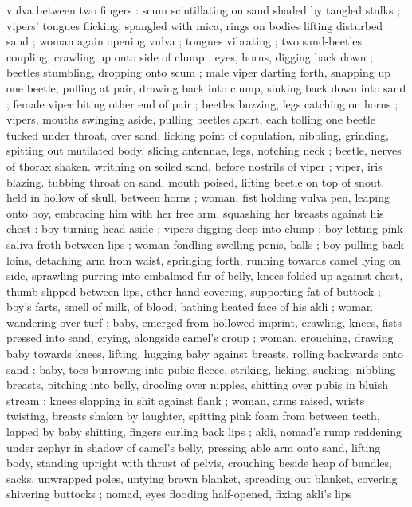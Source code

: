 vulva between two fingers : scum scintillating on sand shaded by 
tangled stalks ; vipers' tongues flicking, spangled with mica, rings on 
bodies lifting disturbed sand ; woman again opening vulva ; tongues 
vibrating ; two sand-beetles coupling, crawling up onto side of clump 
: eyes, horns, digging back down ; beetles stumbling, dropping onto 
scum ; male viper darting forth, snapping up one beetle, pulling at 
pair, drawing back into clump, sinking back down into sand ; female 
viper biting other end of pair ; beetles buzzing, legs catching on 
horns ; vipers, mouths swinging aside, pulling beetles apart, each 
tolling one beetle tucked under throat, over sand, licking point of 
copulation, nibbling, grinding, spitting out mutilated body, slicing 
antennae, legs, notching neck ; beetle, nerves of thorax shaken. 
writhing on soiled sand, before nostrils of viper ; viper, iris blazing. 
tubbing throat on sand, mouth poised, lifting beetle on top of snout. 
held in hollow of skull, between horns ; woman, fist holding vulva 
pen, leaping onto boy, embracing him with her free arm, squashing 
her breasts against his chest : boy turning head aside ; vipers 
digging deep into clump ; boy letting pink saliva froth between lips ; 
woman fondling swelling penis, balls ; boy pulling back loins, 
detaching arm from waist, springing forth, running towards camel 
lying on side, sprawling purring into embalmed fur of belly, knees 
folded up against chest, thumb slipped between lips, other hand 
covering, supporting fat of buttock ; boy's farts, smell of milk, of 
blood, bathing heated face of his akli ; woman wandering over turf ; 
baby, emerged from hollowed imprint, crawling, knees, fists pressed 
into sand, crying, alongside camel's croup ; woman, crouching, 
drawing baby towards knees, lifting, hugging baby against breasts, 
rolling backwards onto sand : baby, toes burrowing into pubic fleece, 
striking, licking, sucking, nibbling breasts, pitching into belly, 
drooling over nipples, shitting over pubis in bluish stream ; knees 
slapping in shit against flank ; woman, arms raised, wrists twisting, 
breasts shaken by laughter, spitting pink foam from between teeth, 
lapped by baby shitting, fingers curling back lips ; akli, nomad's 
rump reddening under zephyr in shadow of camel's belly, pressing 
able arm onto sand, lifting body, standing upright with thrust of 
pelvis, crouching beside heap of bundles, sacks, unwrapped poles, 
untying brown blanket, spreading out blanket, covering shivering 
buttocks ; nomad, eyes flooding half-opened, fixing akli's lips 
